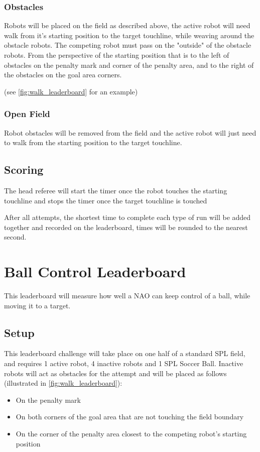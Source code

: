 \subsubsection{Obstacles}
Robots will be placed on the field as described above, the active robot will need walk from it's
starting position to the target touchline, while weaving around the obstacle robots. The competing
robot must pass on the "outside" of the obstacle robots. From the perspective of the starting position
that is to the left of obstacles on the penalty mark and corner of the penalty area, and to the right
of the obstacles on the goal area corners.

(see \cref{fig:walk_leaderboard} for an example)

\subsubsection{Open Field}
Robot obstacles will be removed from the field and the active robot will just need to walk 
from the starting position to the target touchline.

\subsection{Scoring}
The head referee will start the timer once the robot touches the starting touchline and stops the timer once the target touchline is touched

After all attempts, the shortest time to complete each type of run will be added together and recorded
on the leaderboard, times will be rounded to the nearest second.

\section{Ball Control Leaderboard}
This leaderboard will measure how well a NAO can keep control of a ball, while moving it
to a target.

\subsection{Setup}
This leaderboard challenge will take place on one half of a standard SPL field, and requires 1 active robot, 4 inactive robots and 1 SPL Soccer Ball.
Inactive robots will act as obstacles for the attempt and will be placed as follows (illustrated in \cref{fig:walk_leaderboard}):
\begin{itemize}
    \item On the penalty mark
    \item On both corners of the goal area that are not touching the field boundary
    \item On the corner of the penalty area closest to the competing robot's starting position
\end{itemize}

